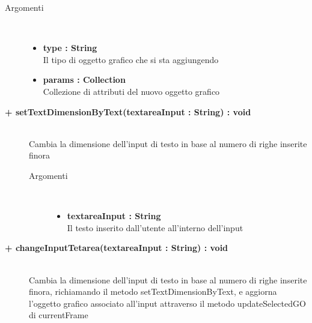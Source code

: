 \begin{description}
\begin{description}
		\begin{description}
			\item[Argomenti] \hfill \\
				\begin{itemize}
				
					\item \textbf{type : String	} \hfill \\
					Il tipo di oggetto grafico che si sta aggiungendo
					\item \textbf{params : Collection	} \hfill \\
					Collezione di attributi del nuovo oggetto grafico
				\end{itemize}
		\end{description}
	\end{description}
	
	\begin{description}
		\item[\textbf{\color{blue}+ setTextDimensionByText(textareaInput : String) : void	 	}] \hfill \\
			Cambia la dimensione dell'input di testo in base al numero di righe inserite finora
			
		\begin{description}
			\item[Argomenti] \hfill \\
				\begin{itemize}
				
					\item \textbf{textareaInput : String	} \hfill \\
					Il testo inserito dall'utente all'interno dell'input
				\end{itemize}
				
		\end{description}
	\end{description}
	
	\begin{description}
		\item[\textbf{\color{blue}+ changeInputTetarea(textareaInput : String) : void	 	}] \hfill \\
			Cambia la dimensione dell'input di testo in base al numero di righe inserite finora, richiamando il metodo setTextDimensionByText, e aggiorna l'oggetto grafico associato all'input attraverso il metodo updateSelectedGO di currentFrame
			

\end{description}
\end{description}
